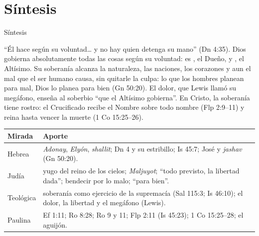 \section{Síntesis}

\begin{frame}{Síntesis}
\begin{tcolorbox}[colback=papiro,colframe=azul,boxrule=1pt,arc=3pt]
\small ``Él hace según su voluntad\ldots{} y no hay quien detenga su mano'' (Dn 4:35). Dios gobierna absolutamente todas las cosas según su voluntad: es , el Dueño, y , el Altísimo. Su soberanía alcanza la naturaleza, las naciones, los corazones y aun el mal que el ser humano causa, sin quitarle la culpa: lo que los hombres planean para mal, Dios lo planea para bien (Gn 50:20). El dolor, que Lewis llamó su megáfono, enseña al soberbio ``que el Altísimo gobierna''. En Cristo, la soberanía tiene rostro: el Crucificado recibe el Nombre sobre todo nombre (Flp 2:9--11) y reina hasta vencer la muerte (1 Co 15:25--26).
\end{tcolorbox}
\scriptsize\renewcommand{\arraystretch}{1.12}
\begin{tabular}{@{}>{\RaggedRight\arraybackslash}p{2.4cm}>{\RaggedRight\arraybackslash}p{9.4cm}@{}}
\toprule
\textbf{Mirada} & \textbf{Aporte} \\ \midrule
Hebrea & \emph{Adonay}, \emph{Elyón}, \emph{shallit}; Dn 4 y su estribillo; Is 45:7; José y \emph{jashav} (Gn 50:20). \\
Judía & yugo del reino de los cielos; \emph{Maljuyot}; ``todo previsto, la libertad dada''; bendecir por lo malo; ``para bien''. \\
Teológica & soberanía como ejercicio de la supremacía (Sal 115:3; Is 46:10); el dolor, la libertad y el megáfono (Lewis). \\
Paulina & Ef 1:11; Ro 8:28; Ro 9 y 11; Flp 2:11 (Is 45:23); 1 Co 15:25--28; el aguijón. \\
\bottomrule
\end{tabular}
\end{frame}


